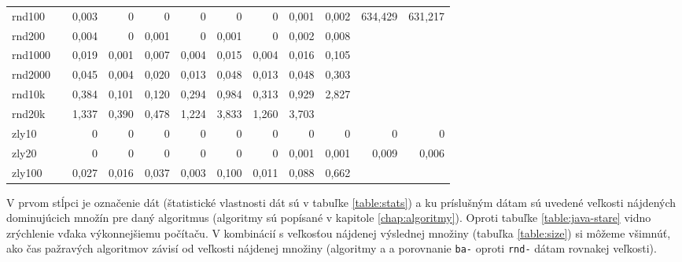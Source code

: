 \begin{landscape}
\begin{table}[h]
{\begin{tabular}{l|rrrrrrrrrrr}
		rnd100  &       & 0,003  & 0       & 0        & 0        & 0        & 0       & 0,001  & 0,002      & 634,429 & 631,217 \\
		rnd200  &       & 0,004  & 0       & 0,001    & 0        & 0,001    & 0       & 0,002  & 0,008      &         &         \\
		rnd1000 &       & 0,019  & 0,001   & 0,007    & 0,004    & 0,015    & 0,004   & 0,016  & 0,105      &         &         \\
		rnd2000 &       & 0,045  & 0,004   & 0,020    & 0,013    & 0,048    & 0,013   & 0,048  & 0,303      &         &         \\
		rnd10k  &       & 0,384  & 0,101   & 0,120    & 0,294    & 0,984    & 0,313   & 0,929  & 2,827      &         &         \\
		rnd20k  &       & 1,337  & 0,390   & 0,478    & 1,224    & 3,833    & 1,260   & 3,703  &            &         &         \\
		zly10   &       & 0      & 0       & 0        & 0        & 0        & 0       & 0      & 0          & 0       & 0       \\
		zly20   &       & 0      & 0       & 0        & 0        & 0        & 0       & 0,001  & 0,001      & 0,009   & 0,006   \\
		zly100  &       & 0,027  & 0,016   & 0,037    & 0,003    & 0,100    & 0,011   & 0,088  & 0,662      &         &         \\ \hline
	\end{tabular}
}
	\smallskip \par
	{\footnotesize
	V prvom stĺpci je označenie dát (štatistické vlastnosti dát sú v tabuľke 
	\ref{table:stats}) a ku príslušným dátam sú uvedené veľkosti nájdených 
	dominujúcich množín pre daný algoritmus (algoritmy sú popísané v kapitole 
	\ref{chap:algoritmy}). Oproti tabuľke \ref{table:java-stare} vidno 
	zrýchlenie vďaka výkonnejšiemu počítaču. V kombinácií s veľkosťou nájdenej 
	výslednej množiny (tabuľka \ref{table:size}) si môžeme všimnúť, ako čas 
	pažravých algoritmov závisí od veľkosti nájdenej množiny (algoritmy 
	 a  a porovnanie \texttt{ba-} oproti \texttt{rnd-} 
	dátam rovnakej veľkosti).}
	\label{table:java}
\end{table}
\end{landscape}

